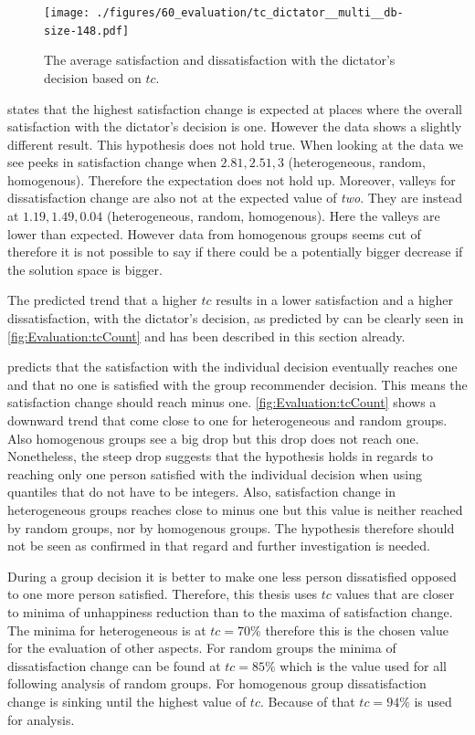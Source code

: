 \begin{figure}
    \centering
    \texttt{[image: ./figures/60\_evaluation/tc\_dictator\_\_multi\_\_db-size-148.pdf]}
    \caption{The average satisfaction and dissatisfaction with the dictator's decision based on $tc$.}
    \label{fig:Evaluation:tcCount}
\end{figure}

 states that the highest satisfaction change is expected at places where the overall satisfaction with the dictator's decision is one. However the data shows a slightly different result. This hypothesis does not hold true. When looking at the data we see peeks in satisfaction change when $2.81, 2.51, 3$ (heterogeneous, random, homogenous). Therefore the expectation does not hold up. Moreover, valleys for dissatisfaction change are also not at the expected value of \textit{two}. They are instead at $1.19, 1.49, 0.04$ (heterogeneous, random, homogenous). Here the valleys are lower than expected. However data from homogenous groups seems cut of therefore it is not possible to say if there could be a potentially bigger decrease if the solution space is bigger.

The predicted trend that a higher $tc$ results in a lower satisfaction and a higher dissatisfaction, with the dictator's decision, as predicted by  can be clearly seen in \autoref{fig:Evaluation:tcCount} and has been described in this section already.

 predicts that the satisfaction with the individual decision eventually reaches one and that no one is satisfied with the group recommender decision. This means the satisfaction change should reach minus one. \autoref{fig:Evaluation:tcCount} shows a downward trend that come close to one for heterogeneous and random groups. Also homogenous groups see a big drop but this drop does not reach one. Nonetheless, the steep drop suggests that the hypothesis holds in regards to reaching only one person satisfied with the individual decision when using quantiles that do not have to be integers. Also, satisfaction change in heterogeneous groups reaches close to minus one but this value is neither reached by random groups, nor by homogenous groups. The hypothesis therefore should not be seen as confirmed in that regard and further investigation is needed.

During a group decision it is better to make one less person dissatisfied opposed to one more person satisfied. Therefore, this thesis uses $tc$ values that are closer to minima of unhappiness reduction than to the maxima of satisfaction change. The minima for heterogeneous is at $tc = 70\%$ therefore this is the chosen value for the evaluation of other aspects. For random groups the minima of dissatisfaction change can be found at $tc = 85\%$ which is the value used for all following analysis of random groups. For homogenous group dissatisfaction change is sinking until the highest value of $tc$. Because of that $tc = 94\%$ is used for analysis.

